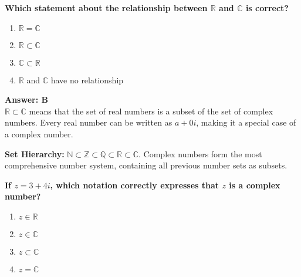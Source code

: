 \documentclass[12pt,a4paper]{article}
\begin{document}
\newpage
\begin{questiontitle}[MCQ 11]
\textbf{Which statement about the relationship between \( \mathbb{R} \) and \( \mathbb{C} \) is correct?}
\end{questiontitle}

\begin{partbox}[Options]
\begin{enumerate}[label=\Alph*.]
    \item \( \mathbb{R} = \mathbb{C} \)
    \item \( \mathbb{R} \subset \mathbb{C} \)
    \item \( \mathbb{C} \subset \mathbb{R} \)
    \item \( \mathbb{R} \) and \( \mathbb{C} \) have no relationship
\end{enumerate}
\end{partbox}

\begin{answerstyle}
\textbf{Answer: B} \\
\( \mathbb{R} \subset \mathbb{C} \) means that the set of real numbers is a subset of the set of complex numbers. Every real number can be written as \( a + 0i \), making it a special case of a complex number.
\end{answerstyle}

\begin{conceptbox}
\textbf{Set Hierarchy:} \( \mathbb{N} \subset \mathbb{Z} \subset \mathbb{Q} \subset \mathbb{R} \subset \mathbb{C} \). Complex numbers form the most comprehensive number system, containing all previous number sets as subsets.
\end{conceptbox}

\newpage
\begin{questiontitle}[MCQ 12]
\textbf{If \( z = 3 + 4i \), which notation correctly expresses that \( z \) is a complex number?}
\end{questiontitle}

\begin{partbox}[Options]
\begin{enumerate}[label=\Alph*.]
    \item \( z \in \mathbb{R} \)
    \item \( z \in \mathbb{C} \)
    \item \( z \subset \mathbb{C} \)
    \item \( z = \mathbb{C} \)
\end{enumerate}
\end{partbox}
\end{document}
